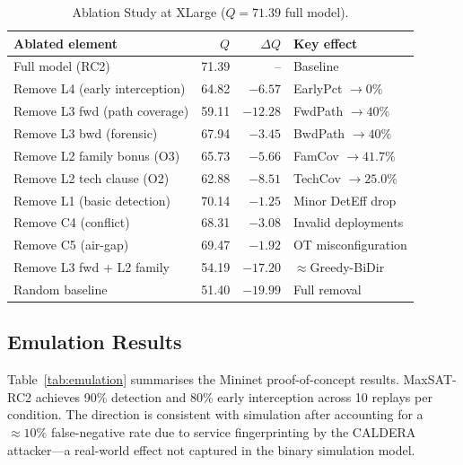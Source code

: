 \documentclass[journal]{IEEEtran}
\begin{document}
\begin{table}[!htb]
\caption{Ablation Study at XLarge ($Q=71.39$ full model).}
\label{tab:ablation}
\centering
\renewcommand{\arraystretch}{1.2}
\begin{tabular}{lrrl}
\toprule
Ablated element & $Q$ & $\Delta Q$ & Key effect \\
\midrule
Full model (RC2)               & 71.39 & -- & Baseline \\
Remove L4 (early interception) & 64.82 & $-6.57$ & EarlyPct $\to 0\%$ \\
Remove L3 fwd (path coverage)  & 59.11 & $-12.28$ & FwdPath $\to 40\%$ \\
Remove L3 bwd (forensic)       & 67.94 & $-3.45$ & BwdPath $\to 40\%$ \\
Remove L2 family bonus (O3)    & 65.73 & $-5.66$ & FamCov $\to 41.7\%$ \\
Remove L2 tech clause (O2)     & 62.88 & $-8.51$ & TechCov $\to 25.0\%$ \\
Remove L1 (basic detection)    & 70.14 & $-1.25$ & Minor DetEff drop \\
Remove C4 (conflict)           & 68.31 & $-3.08$ & Invalid deployments \\
Remove C5 (air-gap)            & 69.47 & $-1.92$ & OT misconfiguration \\
Remove L3 fwd + L2 family      & 54.19 & $-17.20$ & $\approx$Greedy-BiDir \\
Random baseline                & 51.40 & $-19.99$ & Full removal \\
\bottomrule
\end{tabular}
\end{table}

\subsection{Emulation Results}
\label{sec:results:emulation}

Table~\ref{tab:emulation} summarises the Mininet proof-of-concept
results. MaxSAT-RC2 achieves 90\% detection and 80\% early
interception across 10 replays per condition. The direction is
consistent with simulation after accounting for a $\approx10\%$
false-negative rate due to service fingerprinting by the CALDERA
attacker---a real-world effect not captured in the binary simulation
model.
\end{document}
